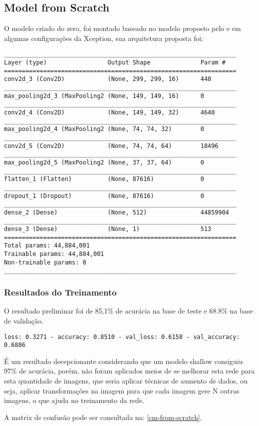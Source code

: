 \subsection{Model from Scratch}

O modelo criado do zero, foi montado baseado no modelo proposto pelo  e em algumas configurações da Xception, sua arquitetura proposta foi:


\begin{verbatim}
_________________________________________________________________
Layer (type)                 Output Shape              Param #   
=================================================================
conv2d_3 (Conv2D)            (None, 299, 299, 16)      448       
_________________________________________________________________
max_pooling2d_3 (MaxPooling2 (None, 149, 149, 16)      0         
_________________________________________________________________
conv2d_4 (Conv2D)            (None, 149, 149, 32)      4640      
_________________________________________________________________
max_pooling2d_4 (MaxPooling2 (None, 74, 74, 32)        0         
_________________________________________________________________
conv2d_5 (Conv2D)            (None, 74, 74, 64)        18496     
_________________________________________________________________
max_pooling2d_5 (MaxPooling2 (None, 37, 37, 64)        0         
_________________________________________________________________
flatten_1 (Flatten)          (None, 87616)             0         
_________________________________________________________________
dropout_1 (Dropout)          (None, 87616)             0         
_________________________________________________________________
dense_2 (Dense)              (None, 512)               44859904  
_________________________________________________________________
dense_3 (Dense)              (None, 1)                 513       
=================================================================
Total params: 44,884,001
Trainable params: 44,884,001
Non-trainable params: 0
_________________________________________________________________
\end{verbatim}

\subsubsection{Resultados do Treinamento}

O resultado preliminar foi de 85,1\% de acurácia na base de teste e 68.8\% na base de validação.


\begin{verbatim}
loss: 0.3271 - accuracy: 0.8510 - val_loss: 0.6158 - val_accuracy: 0.6886
\end{verbatim}


É um resultado decepcionante considerando que um modelo shallow consiguiu 97\% de acurácia, porém, não foram aplicados meios de se melhorar esta rede para esta quantidade de imagens, que seria aplicar técnicas de aumento de dados, ou seja, aplicar transformações na imagem para que cada imagem gere N outras imagens, o que ajuda no treinamento da rede.

A matrix de confusão pode ser consultada na: \autoref{cm-from-scratch}, 